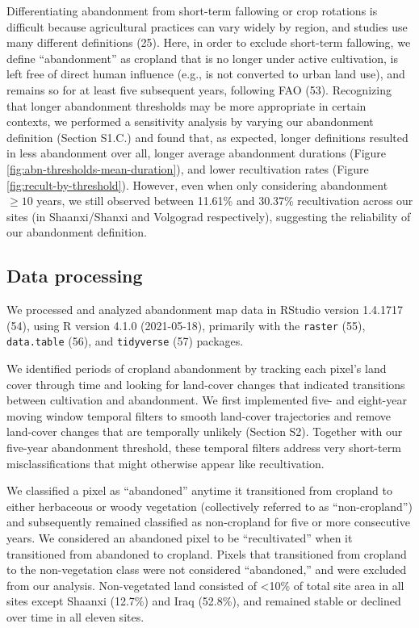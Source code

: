 \documentclass[9pt,twocolumn,twoside,lineno]{pnas-new}
\begin{document}
Differentiating abandonment from short-term fallowing or crop rotations is difficult because agricultural practices can vary widely by region, and studies use many different definitions (25).
Here, in order to exclude short-term fallowing, we define ``abandonment'' as cropland that is no longer under active cultivation, is left free of direct human influence (e.g., is not converted to urban land use), and remains so for at least five subsequent years, following FAO (53).
Recognizing that longer abandonment thresholds may be more appropriate in certain contexts, we performed a sensitivity analysis by varying our abandonment definition (Section S1.C.) and found that, as expected, longer definitions resulted in less abandonment over all, longer average abandonment durations (Figure \ref{fig:abn-thresholds-mean-duration}), and lower recultivation rates (Figure \ref{fig:recult-by-threshold}).
However, even when only considering abandonment \(\geq10\) years, we still observed between 11.61\% and 30.37\% recultivation across our sites (in Shaanxi/Shanxi and Volgograd respectively), suggesting the reliability of our abandonment definition.

\hypertarget{data-processing}{%
\subsection*{Data processing}\label{data-processing}}

We processed and analyzed abandonment map data in RStudio version 1.4.1717 (54), using R version 4.1.0 (2021-05-18), primarily with the \texttt{raster} (55), \texttt{data.table} (56), and \texttt{tidyverse} (57) packages.

We identified periods of cropland abandonment by tracking each pixel's land cover through time and looking for land-cover changes that indicated transitions between cultivation and abandonment.
We first implemented five- and eight-year moving window temporal filters to smooth land-cover trajectories and remove land-cover changes that are temporally unlikely (Section S2).
Together with our five-year abandonment threshold, these temporal filters address very short-term misclassifications that might otherwise appear like recultivation.

We classified a pixel as ``abandoned'' anytime it transitioned from cropland to either herbaceous or woody vegetation (collectively referred to as ``non-cropland'') and subsequently remained classified as non-cropland for five or more consecutive years.
We considered an abandoned pixel to be ``recultivated'' when it transitioned from abandoned to cropland.
Pixels that transitioned from cropland to the non-vegetation class were not considered ``abandoned,'' and were excluded from our analysis.
Non-vegetated land consisted of \textless10\% of total site area in all sites except Shaanxi (12.7\%) and Iraq (52.8\%), and remained stable or declined over time in all eleven sites.
\end{document}
